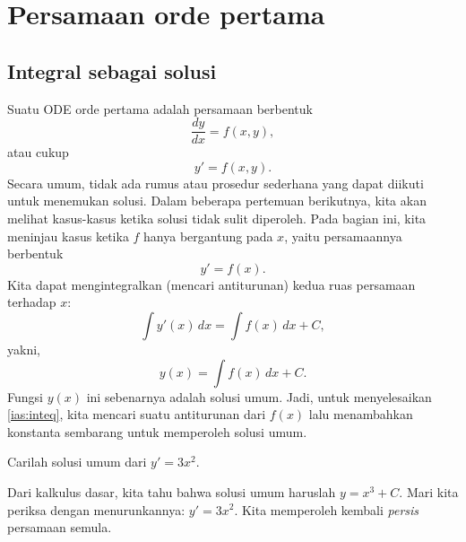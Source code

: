 \chapter{Persamaan orde pertama} \label{fo:chapter}


\section{Integral sebagai solusi}
\label{integralsols:section}


Suatu ODE orde pertama adalah persamaan berbentuk
\begin{equation*}
\frac{dy}{dx} = f(x,y) ,
\end{equation*}
atau cukup
\begin{equation*}
y' = f(x,y) .
\end{equation*}
Secara umum, tidak ada rumus atau prosedur sederhana yang dapat diikuti untuk
menemukan solusi.
Dalam beberapa pertemuan berikutnya, kita akan melihat kasus-kasus ketika solusi
tidak sulit diperoleh.
Pada bagian ini, kita meninjau kasus ketika $f$ hanya bergantung pada $x$,
yaitu persamaannya berbentuk
\begin{equation} \label{ias:inteq}
y' = f(x) .
\end{equation}
Kita dapat mengintegralkan (mencari antiturunan) kedua ruas persamaan terhadap $x$:
\begin{equation*}
\int y'(x) \,dx = \int f(x) \,dx + C ,
\end{equation*}
yakni,
\begin{equation*}
y(x) = \int f(x) \,dx + C .
\end{equation*}
Fungsi $y(x)$ ini sebenarnya adalah solusi umum.
Jadi, untuk menyelesaikan \eqref{ias:inteq},
kita mencari suatu antiturunan dari $f(x)$
lalu menambahkan konstanta sembarang untuk memperoleh solusi umum.

\begin{example}
Carilah solusi umum dari $y' = 3 x^2$.

Dari kalkulus dasar, kita tahu
bahwa solusi umum haruslah $y = x^3 + C$. Mari kita periksa dengan
menurunkannya:
$y' = 3x^2$. Kita memperoleh kembali \emph{persis} persamaan semula.
\end{example}

